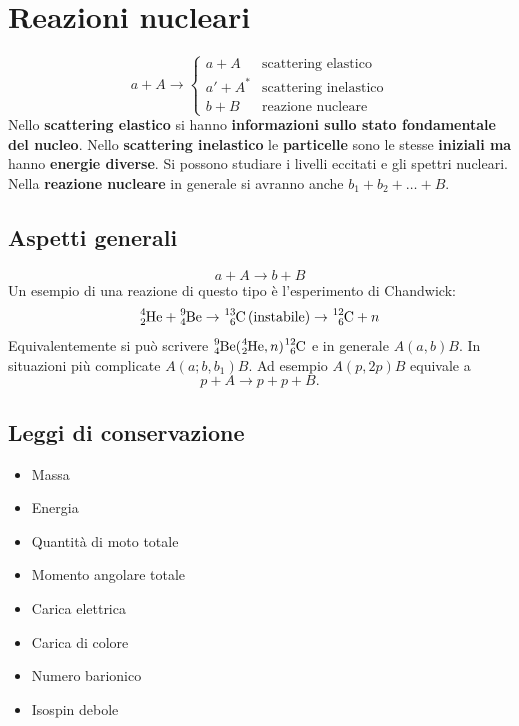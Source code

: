 \documentclass[a4paper,11pt,twoside,openany]{book}
\theoremstyle{definition}
\theoremstyle{plain}
\theoremstyle{plain}
\theoremstyle{definition}
\begin{document}
\chapter{Reazioni nucleari} %
\begin{equation}
a+A\longrightarrow \begin{cases}
a+A & \textrm{scattering elastico} \\
a'+A^* & \textrm{scattering inelastico} \\
b+B & \textrm{reazione nucleare}
\end{cases}
\end{equation}
Nello \textbf{scattering elastico} si hanno \textbf{informazioni sullo stato fondamentale del nucleo}. Nello \textbf{scattering inelastico} le \textbf{particelle} sono le stesse \textbf{iniziali ma} hanno \textbf{energie diverse}. Si possono studiare i livelli eccitati e gli spettri nucleari. Nella \textbf{reazione nucleare} in generale si avranno anche $b_1+b_2+\dots+B$.

\section{Aspetti generali} %
$$a+A\longrightarrow b+B$$
Un esempio di una reazione di questo tipo è l'esperimento di Chandwick:
\begin{equation}
\ce{^4_2He}+\ce{^9_4Be}\rightarrow \ce{^{13}_6C} \left(\textrm{instabile}\right)\rightarrow \ce{^{12}_6C}+n
\end{equation}
Equivalentemente si può scrivere $\ce{^{9}_{4}Be}(\ce{^4_2He},n)\ce{^{12}_{6}C}$ e in generale $A(a,b)B$. In situazioni più complicate $A(a;b,b_1)B$. Ad esempio $A(p,2p)B$ equivale a $$p+A\longrightarrow p+p+B.$$

\section{Leggi di conservazione} %
\begin{itemize}
\item Massa
\item Energia
\item Quantità di moto totale
\item Momento angolare totale
\item Carica elettrica
\item Carica di colore
\item Numero barionico
\item Isospin debole
\end{itemize}
\end{document}
